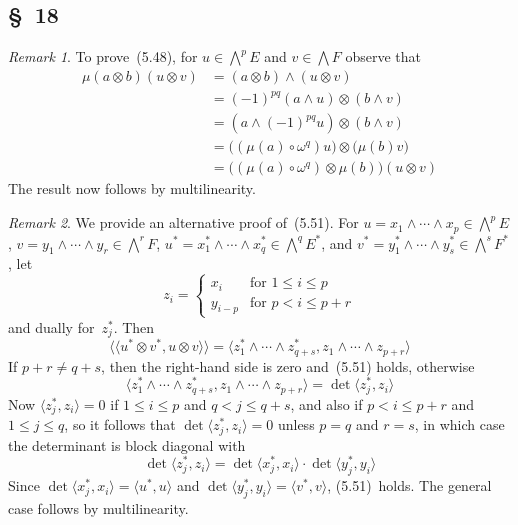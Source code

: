 \documentclass[letterpaper,12pt]{article}
\newcommand{\after}{\circ}
\newcommand{\mult}{\cdot}
\newcommand{\tprod}{\otimes}
\newcommand{\eprod}{\wedge}
\newcommand{\bigeprod}{\bigwedge}
\newcommand{\medeprod}{{\textstyle\bigeprod}}
\newcommand{\sprod}[2]{\langle#1,#2\rangle}
\newcommand{\ssprod}[2]{\langle\!\langle#1,#2\rangle\!\rangle}
\newcommand{\multi}[4]{#2_{#3}#1\cdots#1#2_{#4}}
\newcommand{\eprods}[3]{\multi{\eprod}{#1}{#2}{#3}}
\theoremstyle{definition}
\theoremstyle{remark}
\newtheorem*{rmk}{Remark}
\begin{document}
\subsection*{\S~18}
\begin{rmk}
To prove~(5.48), for \(u\in\medeprod^p E\) and \(v\in\medeprod F\) observe that
\begin{align*}
\mu(a\tprod b)(u\tprod v)&=(a\tprod b)\eprod(u\tprod v)\\
	&=(-1)^{pq}(a\eprod u)\tprod(b\eprod v)\\
	&=(a\eprod(-1)^{pq}u)\tprod(b\eprod v)\\
	&=\bigl((\mu(a)\after\omega^q)u\bigr)\tprod\bigl(\mu(b)v\bigr)\\
	&=\bigl((\mu(a)\after\omega^q)\tprod\mu(b)\bigr)(u\tprod v)
\end{align*}
The result now follows by multilinearity.
\end{rmk}

\begin{rmk}
We provide an alternative proof of~(5.51). For \(u=\eprods{x}{1}{p}\in\medeprod^p E\), \(v=\eprods{y}{1}{r}\in\medeprod^r F\), \(u^*=\eprods{x^*}{1}{q}\in\medeprod^q E^*\), and \(v^*=\eprods{y^*}{1}{s}\in\medeprod^s F^*\), let
\[z_i=\begin{cases}
x_i&\text{for }1\le i\le p\\
y_{i-p}&\text{for }p<i\le p+r
\end{cases}\]
and dually for~\(z^*_j\). Then
\[\ssprod{u^*\tprod v^*}{u\tprod v}=\sprod{\eprods{z^*}{1}{q+s}}{\eprods{z}{1}{p+r}}\]
If \(p+r\ne q+s\), then the right-hand side is zero and~(5.51) holds, otherwise
\[\sprod{\eprods{z^*}{1}{q+s}}{\eprods{z}{1}{p+r}}=\det\sprod{z^*_j}{z_i}\]
Now \(\sprod{z^*_j}{z_i}=0\) if \(1\le i\le p\) and \(q<j\le q+s\), and also if \(p<i\le p+r\) and \(1\le j\le q\), so it follows that \(\det\sprod{z^*_j}{z_i}=0\) unless \(p=q\) and \(r=s\), in which case the determinant is block diagonal with
\[\det\sprod{z^*_j}{z_i}=\det\sprod{x^*_j}{x_i}\mult\det\sprod{y^*_j}{y_i}\]
Since \(\det\sprod{x^*_j}{x_i}=\sprod{u^*}{u}\) and \(\det\sprod{y^*_j}{y_i}=\sprod{v^*}{v}\), (5.51)~holds. The general case follows by multilinearity.
\end{rmk}
\end{document}
